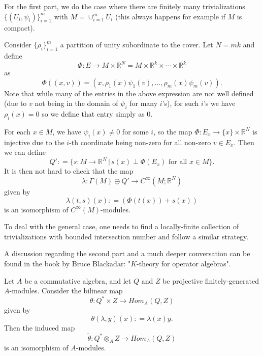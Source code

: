 \documentclass{ximera}
\begin{document}
\begin{solution}
For the first part, we do the case where there are finitely many trivializations $\{ (U_i, \psi _i ) \}_{i =1} ^m $ with $M = \cup _{i =1 }^m  U_i$ (this always happens for example if $M$ is compact). 

Consider $\{ \rho _i \} _{i = 1 }^m$ a partition of unity subordinate to the cover. Let $N = m k$ and define 
\[  \Phi : E \to M \times \mathbb{R}^N  = M \times \mathbb{R}^k \times \cdots \times \mathbb{R}^k      \]
as 
\[    \Phi (  (x, v ) ) = ( x , \rho _1 (x)  \psi _1 (v) , \ldots , \rho _m (x) \psi _m (v)  ) .            \]
Note that while many of the entries in the above expression are not well defined (due to $v$ not being in the domain of $\psi _i$ for many $i$'s), for such $i$'s we have $\rho_i (x) = 0$ so we define that entry simply as $0$. 

For each $x \in M$, we have $\psi _i (x) \neq 0$ for some $i$, so the map $\Phi : E_x \to \{ x \} \times \mathbb{R}^N$ is injective due to the $i$-th coordinate being non-zero for all non-zero $v \in E_x$. Then we can define 
\[      Q' : = \{ s : M \to  \mathbb{R}^N  \, \vert \, s(x) \perp \Phi (E_x) \text{ for all }x \in M  \}  .       \]
It is then not hard to check that the map 
\[      \lambda : \Gamma (M) \oplus Q ' \to C^{\infty}(M ; \mathbb{R}^N)              \]
given by 
\[ \lambda ( t , s ) (x)  : =  ( \Phi ( t(x) ) +  s (x)  )  \]
is an isomorphism of $C^{\infty}(M)$-modules.

To deal with the general case, one needs to find a locally-finite collection of trivializations with bounded intersection number and follow a similar strategy. 



A discussion regarding the second part and a much deeper conversation can be found in the book by Bruce Blackadar: "$K$-theory for operator algebras".

\end{solution}


\begin{theorem}[Duality]
    Let $A$ be a commutative algebra, and let  $Q$ and $Z$ be projective finitely-generated $A$-modules. Consider the bilinear map 
    \[ \theta :  Q^{\ast} \times Z \to Hom _A (Q , Z) \] 
    given by 
    \[ \theta ( \lambda , y ) (x ) : = \lambda (x) y . \]
    Then the induced map  
    \[      \tilde{\theta} : Q ^{\ast} \otimes _A Z \to Hom _A( Q,Z)             \]
    is an isomorphism of $A$-modules. 
\end{theorem}
\end{document}
